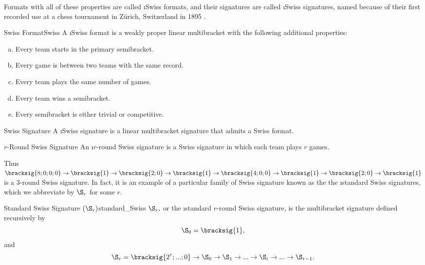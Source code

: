 {    Formats with all of these properties are called \i{Swiss formats}, and their signatures are called \i{Swiss signatures}, named because of their first recorded use at a chess tournament in Zürich, Switzerland in 1895 \cite{info_swiss}.

    \begin{definition}{Swiss Format}{Swiss}
        A \i{Swiss format} is a weakly proper linear multibracket with the following additional properties:
        \begin{enumerate}[(a)]
            \item Every team starts in the primary semibracket.
            \item Every game is between two teams with the same record.
            \item Every team plays the same number of games.
            \item Every team wins a semibracket.
            \item Every semibracket is either trivial or competitive.
        \end{enumerate}
    \end{definition}

    \begin{definition}{Swiss Signature}{}
        A \i{Swiss signature} is a linear multibracket signature that admits a Swiss format.
    \end{definition}

    \begin{definition}{$r$-Round Swiss Signature}{}
        An \i{$r$-round Swiss signature} is a Swiss signature in which each team plays $r$ games.
    \end{definition}
    
    Thus $\bracksig{8;0;0;0} \to \bracksig{1} \to \bracksig{2;0} \to \bracksig{1} \to \bracksig{4;0;0} \to \bracksig{1} \to \bracksig{2;0} \to \bracksig{1}$ is a $3$-round Swiss signature. In fact, it is an example of a particular family of Swiss signature known as the the \i{standard Swiss signatures}, which we abbreviate by $\S_r$ for some $r$.

    \begin{definition}{Standard Swiss Signature $(\S_r)$}{standard_Swiss}
        $\S_r,$ or the \i{standard $r$-round Swiss signature}, is the multibracket signature defined recursively by $$\S_0 = \bracksig{1},$$ and
        $$\S_r = \bracksig{2^r; ...; 0} \to \S_{0} \to \S_1 \to ... \to \S_i \to ... \to \S_{r-1}.$$
    \end{definition}

}
